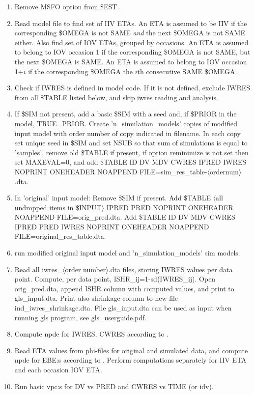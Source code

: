 \begin{enumerate}
\item Remove MSFO option from \$EST.
\item Read model file to find set of IIV ETAs. An ETA is assumed to be IIV if the
corresponding \$OMEGA is not SAME
\emph{and} the next \$OMEGA is not SAME either. Also find set of IOV ETAs, grouped by occasions.
An ETA is assumed to belong to IOV occasion 1 if the corresponding \$OMEGA is not SAME,
but the next \$OMEGA is SAME. 
An ETA is assumed to belong to IOV occasion 1+$i$ if the corresponding \$OMEGA the $i$th consecutive SAME \$OMEGA.
\item Check if IWRES is defined in model code. If it is not defined, exclude
IWRES from all \$TABLE listed below, and skip iwres reading and analysis.
\item If \$SIM not present, add a basic \$SIM with a seed and, if \$PRIOR in the model, TRUE=PRIOR.
Create 'n\_simulation\_models' copies of modified
input model with order number of copy indicated in filename. In each copy set unique
seed in \$SIM and set
NSUB so that sum of simulations is equal to 'samples', remove old \$TABLE if present, 
if option reminimize is not set then set MAXEVAL=0, and
add \$TABLE ID DV MDV CWRES IPRED IWRES NOPRINT ONEHEADER NOAPPEND FILE=sim\_res\_table-$\langle$ordernum$\rangle$.dta. 
\item In 'original' input model:
Remove \$SIM if present.
Add \$TABLE $\langle$all undropped items in
\$INPUT$\rangle$ IPRED PRED NOPRINT ONEHEADER NOAPPEND FILE=orig\_pred.dta.
Add \$TABLE ID DV MDV CWRES IPRED PRED IWRES NOPRINT ONEHEADER NOAPPEND FILE=original\_res\_table.dta. 
\item run modified original input model and 'n\_simulation\_models' sim models.
\item Read all iwres\_$\langle$order number$\rangle$.dta files,
storing IWRES values per data point. Compute, per data point, ISHR\_ij=1-sd(IWRES\_ij).
Open orig\_pred.dta, append ISHR column with
computed values,
and print to gls\_input.dta. Print also shrinkage column to new file ind\_iwres\_shrinkage.dta. File gls\_input.dta
can be used as input when running gls program, see gls\_userguide.pdf. 
\item Compute npde for IWRES, CWRES according to \cite{Comets}.
\item Read ETA values from 
phi-files for original and simulated data, and compute npde for EBE:s according to \cite{Comets}.
Perform computations separately for IIV ETA and each occasion IOV ETA.
\item Run basic vpc:s for DV vs PRED and CWRES vs TIME (or idv).
\end{enumerate}

